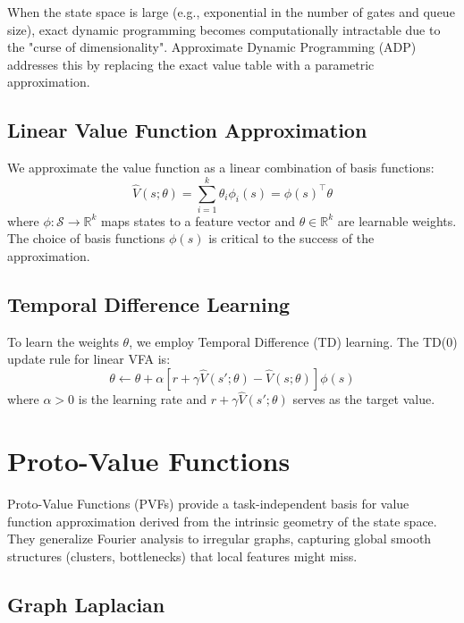 When the state space is large (e.g., exponential in the number of gates and queue size), exact dynamic programming becomes computationally intractable due to the "curse of dimensionality".
Approximate Dynamic Programming (ADP) addresses this by replacing the exact value table with a parametric approximation.

\subsection{Linear Value Function Approximation}

We approximate the value function as a linear combination of basis functions:
%
\begin{equation}
	\hat{V}(s; \theta) = \sum_{i=1}^k \theta_i \phi_i(s) = \phi(s)^\top \theta
\end{equation}
%
where $\phi: \mathcal{S} \to \mathbb{R}^k$ maps states to a feature vector and $\theta \in \mathbb{R}^k$ are learnable weights. The choice of basis functions $\phi(s)$ is critical to the success of the approximation.

\subsection{Temporal Difference Learning}

To learn the weights $\theta$, we employ Temporal Difference (TD) learning. The TD(0) update rule for linear VFA is:
%
\begin{equation}
	\theta \leftarrow \theta + \alpha \left[r + \gamma \hat{V}(s'; \theta) - \hat{V}(s; \theta)\right] \phi(s)
\end{equation}
%
where $\alpha > 0$ is the learning rate and $r + \gamma \hat{V}(s'; \theta)$ serves as the target value.

\section{Proto-Value Functions}

Proto-Value Functions (PVFs) provide a task-independent basis for value function approximation derived from the intrinsic geometry of the state space. They generalize Fourier analysis to irregular graphs, capturing global smooth structures (clusters, bottlenecks) that local features might miss.

\subsection{Graph Laplacian}

